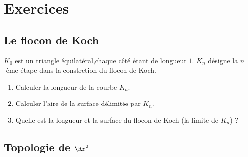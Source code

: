 \documentclass[11pt,class=report,crop=false]{standalone}
\newcommand{\commentfigure}[1]{#1} %
\begin{document}
\section{Exercices}


\subsection{Le flocon de Koch}

\begin{exercicecours}
$K_0$ est un triangle équilatéral,chaque côté étant de longueur $1$.
$K_n$ désigne la $n$-ème étape dans la constrction du flocon de Koch. 
\begin{enumerate}
 \item Calculer la longueur de la courbe $K_n$.
 \item Calculer l'aire de la surface délimitée par $K_n$.
 \item Quelle est la longueur et la surface du flocon de Koch (la limite de $K_n$) ?
\end{enumerate}

\commentfigure{
}
\end{exercicecours}


\subsection{Topologie de $\Rr^2$}
\end{document}
